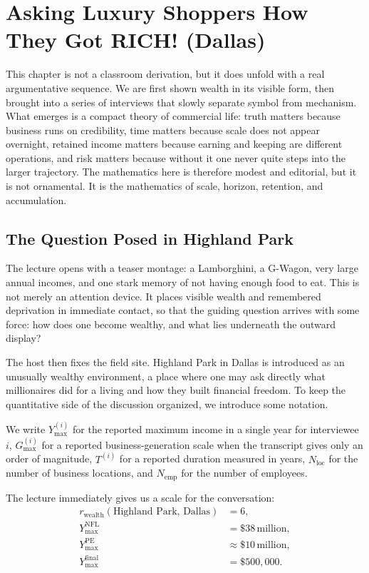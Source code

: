 \chapter{Asking Luxury Shoppers How They Got RICH! (Dallas)}

This chapter is not a classroom derivation, but it does unfold with a real argumentative sequence. We are first shown wealth in its visible form, then brought into a series of interviews that slowly separate symbol from mechanism. What emerges is a compact theory of commercial life: truth matters because business runs on credibility, time matters because scale does not appear overnight, retained income matters because earning and keeping are different operations, and risk matters because without it one never quite steps into the larger trajectory. The mathematics here is therefore modest and editorial, but it is not ornamental. It is the mathematics of scale, horizon, retention, and accumulation.

\section{The Question Posed in Highland Park}

The lecture opens with a teaser montage: a Lamborghini, a G-Wagon, very large annual incomes, and one stark memory of not having enough food to eat. This is not merely an attention device. It places visible wealth and remembered deprivation in immediate contact, so that the guiding question arrives with some force: how does one become wealthy, and what lies underneath the outward display?

The host then fixes the field site. Highland Park in Dallas is introduced as an unusually wealthy environment, a place where one may ask directly what millionaires did for a living and how they built financial freedom. To keep the quantitative side of the discussion organized, we introduce some notation.

\begin{definition}
We write \(Y_{\max}^{(i)}\) for the reported maximum income in a single year for interviewee \(i\), \(G_{\max}^{(i)}\) for a reported business-generation scale when the transcript gives only an order of magnitude, \(T^{(i)}\) for a reported duration measured in years, \(N_{\mathrm{loc}}\) for the number of business locations, and \(N_{\mathrm{emp}}\) for the number of employees.
\end{definition}

The lecture immediately gives us a scale for the conversation:
\begin{align}
r_{\mathrm{wealth}}(\text{Highland Park, Dallas}) &= 6,\\
Y_{\max}^{\mathrm{NFL}} &= \$38\,\text{million},\\
Y_{\max}^{\mathrm{PE}} &\approx \$10\,\text{million},\\
Y_{\max}^{\mathrm{final}} &= \$500{,}000.
\end{align}

